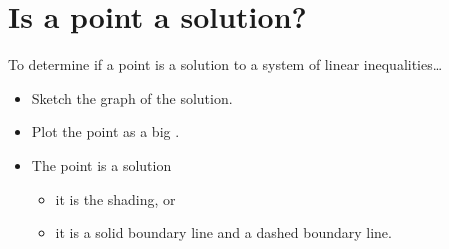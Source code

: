 \section{Is a point a solution?}

\begin{myConcept}{To determine if a point is a solution to a system of linear inequalities\dots}
  \begin{itemize}[fullwidth]
    \item Sketch the graph of the solution.
    \item Plot the point as a big .
    \item The point {is} a solution 
    \begin{itemize}
      \item it is   the shading, or 
      \item it is  a solid boundary line and   a dashed boundary line.
    \end{itemize}
  \end{itemize}
\end{myConcept}



